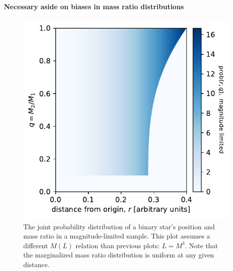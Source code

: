 \documentclass{emulateapj}
\begin{document}
\paragraph{Necessary aside on biases in mass ratio distributions}

\begin{figure}[!t]
	\begin{center}
		\includegraphics[scale=.8]{figures/joint_prob_r_q.pdf}
	\end{center}
	\caption{The joint probability distribution of a binary star's position and 
		mass ratio in a magnitude-limited sample. This plot assumes a different 
		$M(L)$ relation than previous plots: $L=M^3$. Note that the marginalized 
		mass ratio distribution is uniform at any given distance.}
	\label{fig:joint_prob_r_q}
\end{figure}
\end{document}
